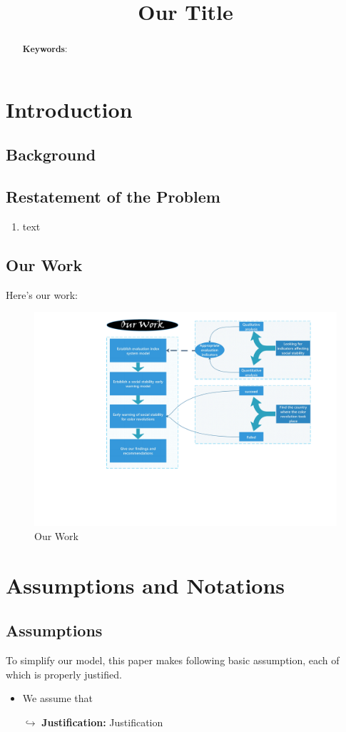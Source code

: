 \documentclass[12pt]{article}  %
\title{{\sc Our Title}}  %
\begin{document}
\begin{abstract}

    \vspace{5pt}
    \textbf{Keywords}:

\end{abstract}

\maketitle  %
\tableofcontents  %


\section{Introduction}
\subsection{Background}

\subsection{Restatement of the Problem}
\begin{enumerate}
\item text
\end{enumerate}
\subsection{Our Work}
{\LARGE\CheckedBox} 

 Here's our work:
\begin{figure}[htbp]
\centering
\includegraphics[width=.4\textwidth]{img/our work.pdf}
\caption{Our Work}
\end{figure}


\section{Assumptions and Notations}
\subsection{Assumptions}
To simplify our model, this paper makes following basic assumption, each of which is properly
justified.
\begin{itemize}
	\item We assume that

	$\hookrightarrow$ \textbf{Justification:} Justification
\end{itemize}
\end{document}
